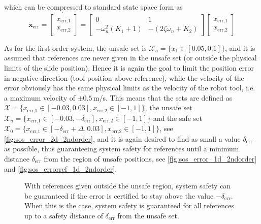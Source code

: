which can be compressed to standard state space form as
\begin{equation}
\dot{\mathbf{x}}_\text{err}= 
\dot{\begin{bmatrix}
{x}_\text{err,1} \\ 
{x}_\text{err,2}
\end{bmatrix}} =
\begin{bmatrix}
0 & 1 \\
-\omega_n^2(K_1+1) & -(2\zeta\omega_n +K_2)
\end{bmatrix}
\begin{bmatrix}
x_\text{err,1} \\ {x}_\text{err,2}
\end{bmatrix}
\end{equation}

As for the first order system, the unsafe set is $\mathcal{X}_u=\{x_1\in[0.05,0.1] \}$, and it is assumed that references are never given in the unsafe set (or outside the physical limits of the slide position). Hence it is again the goal to limit the position error in negative direction (tool position above reference), while the velocity of the error obviously has the same physical limits as the velocity of the robot tool, i.e. a maximum velocity of $\pm 0.5$\,m/s. This means that the sets are defined as $\mathcal{X}=\{x_\text{err,1}\in[-0.03,0.03], x_\text{err,2}\in[-1,1] \}$, the unsafe set $\mathcal{X}_u=\{x_\text{err,1}\in[-0.03,-\delta_\text{err}], x_\text{err,2}\in[-1,1] \}$ and the safe set $\mathcal{X}_0=\{x_\text{err,1}\in[-\delta_\text{err} +\Delta,0.03], x_\text{err,2}\in[-1,1] \}$, see \autoref{fig:sos_error_2d_2ndorder}, and it is again desired to find as small a value $\delta_\text{err}$ as possible, thus guaranteeing system safety for references until a minimum distance $\delta_\text{err}$ from the region of unsafe positions, see \autoref{fig:sos_error_1d_2ndorder} and \ref{fig:sos_errorref_1d_2ndorder}.

\begin{figure}[H]
	\centering
	\hspace{3mm}
%
\hspace{3mm}
%
	\caption{With references given outside the unsafe region, system safety can be guaranteed if the error is certified to stay above the value $-\delta_\text{err}$. When this is the case, system safety is guaranteed for all references up to a safety distance of $\delta_\text{err}$ from the unsafe set.}
	\label{fig:sets_error_2ndorder}
\end{figure}

